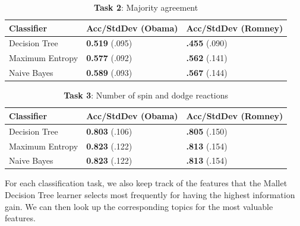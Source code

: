 \documentclass[12pt]{article}
\begin{document}
\begin{table}[H]
\begin{centering}
\begin{tabular}{ l | l | l }
Classifier & Acc/StdDev (Obama) & Acc/StdDev (Romney) \\
\hline
Decision Tree & \textbf{0.519} (.095) &  \textbf{.455} (.090) \\
Maximum Entropy & \textbf{0.577} (.092) &  \textbf{.562} (.141) \\
Naive Bayes & \textbf{0.589} (.093) &  \textbf{.567} (.144) \\
\end{tabular}
\caption{\textbf{Task 2}: Majority agreement}
\end{centering}
\end{table}

\begin{table}[H]
\begin{centering}
\begin{tabular}{ l | l | l }
Classifier & Acc/StdDev (Obama) & Acc/StdDev (Romney) \\
\hline
Decision Tree & \textbf{0.803} (.106) &  \textbf{.805} (.150) \\
Maximum Entropy & \textbf{0.823} (.122) &  \textbf{.813} (.154) \\
Naive Bayes & \textbf{0.823} (.122) &  \textbf{.813} (.154) \\
\end{tabular}
\caption{\textbf{Task 3}: Number of spin and dodge reactions}
\label{tab:task3boydstun}
\end{centering}
\end{table}

For each classification task, we also keep track of the features that the Mallet Decision Tree learner selects most frequently for having the highest information gain. We can then look up the corresponding topics for the most valuable features.
\end{document}
